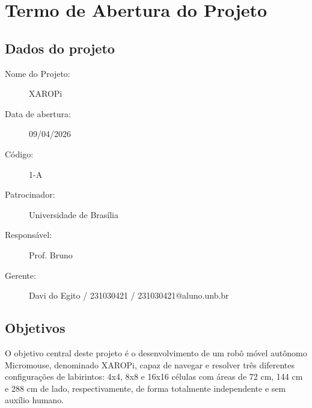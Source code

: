 \chapter{Termo de Abertura do Projeto}


\section{Dados do projeto}
\begin{description}
    \item [Nome do Projeto:] XAROPi
    \item [Data de abertura:] 09/04/2026
    \item [Código:] 1-A
    \item [Patrocinador:] Universidade de Brasília
    \item [Responsável:] Prof. Bruno
    \item [Gerente:] Davi do Egito / 231030421 / 231030421@aluno.unb.br
\end{description}

\section{Objetivos}

O objetivo central deste projeto é o desenvolvimento de um robô móvel autônomo Micromouse, denominado XAROPi, capaz de navegar e resolver três diferentes configurações de labirintos: 4x4, 8x8 e 16x16 células com áreas de 72 cm, 144 cm e 288 cm de lado, respectivamente, de forma totalmente independente e sem auxílio humano.

